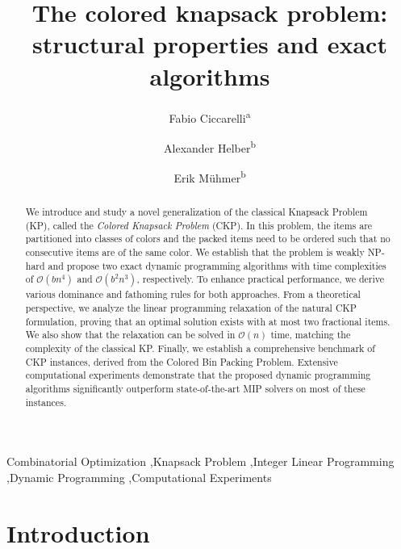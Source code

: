 \documentclass[preprint,11pt]{elsarticle}
\def \comma{,}
\theoremstyle{definition}
\begin{document}
\begin{frontmatter}
\title{The colored knapsack problem: structural properties and exact algorithms}

\author{Fabio Ciccarelli\textsuperscript{a}}
\author{Alexander Helber\textsuperscript{b}} 
\author{Erik M\"uhmer\textsuperscript{b}}

\let\comma,





\begin{abstract}
We introduce and study a novel generalization of the classical Knapsack Problem (KP), called the \textit{Colored Knapsack Problem} (CKP). 
In this problem, the items are partitioned into classes of colors and the packed items need to be ordered such that no consecutive items are of the same color. 
We establish that the problem is weakly NP-hard and propose two exact dynamic programming algorithms with time complexities of $\mathcal{O}(bn^4)$ and $\mathcal{O}(b^2n^3)$, respectively. 
To enhance practical performance, we derive various dominance and fathoming rules for both approaches. 
From a theoretical perspective, we analyze the linear programming relaxation of the natural CKP formulation, proving that an optimal solution exists with at most two fractional items. We also show that the relaxation can be solved in $\mathcal{O}(n)$ time, matching the complexity of the classical KP. 
Finally, we establish a comprehensive benchmark of CKP instances, derived from the Colored Bin Packing Problem. 
Extensive computational experiments demonstrate that the proposed dynamic programming algorithms significantly outperform state-of-the-art MIP solvers on most of these instances.

\end{abstract}

  \begin{keyword}
    {Combinatorial Optimization \sep Knapsack Problem \sep Integer Linear Programming \sep Dynamic Programming \sep Computational Experiments}
  \end{keyword}
\end{frontmatter}


\section{Introduction}\label{sec:intro}
\end{document}

